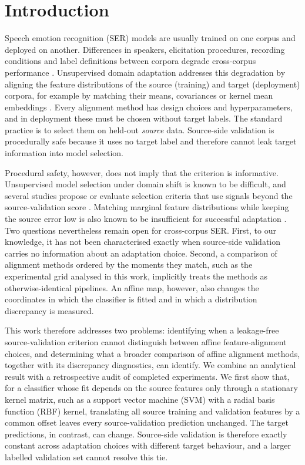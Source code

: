 \section{Introduction}
\label{sec:introduction}

Speech emotion recognition (SER) models are usually trained on one corpus and
deployed on another. Differences in speakers, elicitation procedures, recording
conditions and label definitions between corpora degrade cross-corpus
performance \cite{schuller2010cross}. Unsupervised domain adaptation addresses
this degradation by aligning the feature distributions of the source (training)
and target (deployment) corpora, for example by matching their means,
covariances or kernel mean embeddings
\cite{sun2016coral,gretton2012kernel,long2015dan}. Every alignment method has
design choices and hyperparameters, and in deployment these must be chosen
without target labels. The standard practice is to select them on held-out
\emph{source} data. Source-side validation is procedurally safe because it uses
no target label and therefore cannot leak target information into model
selection.

Procedural safety, however, does not imply that the criterion is informative.
Unsupervised model selection under domain shift is known to be difficult, and
several studies propose or evaluate selection criteria that use signals beyond
the source-validation score
\cite{you2019selection,ericsson2023practices,hu2024selection}. Matching marginal
feature distributions while keeping the source error low is also known to be
insufficient for successful adaptation \cite{zhao2019invariant}. Two questions
nevertheless remain open for cross-corpus SER. First, to our knowledge, it
has not been characterised exactly when source-side validation carries no
information about an adaptation choice. Second, a comparison of alignment methods ordered by the
moments they match, such as the experimental grid analysed in this work,
implicitly treats the methods as otherwise-identical pipelines. An affine map,
however, also changes the coordinates in which the classifier is fitted and in
which a distribution discrepancy is measured.

This work therefore addresses two problems: identifying when a leakage-free
source-validation criterion cannot distinguish between affine feature-alignment
choices, and determining what a broader comparison of affine alignment methods,
together with its discrepancy diagnostics, can identify. We combine an
analytical result with a retrospective audit of completed experiments. We first
show that, for a classifier whose fit depends on the source features only
through a stationary kernel matrix, such as a support vector machine (SVM) with
a radial basis function (RBF) kernel, translating all source training and
validation features by a common offset leaves every source-validation
prediction unchanged. The target predictions, in contrast, can change.
Source-side validation is therefore exactly constant across adaptation choices
with different target behaviour, and a larger labelled validation set cannot
resolve this tie.

